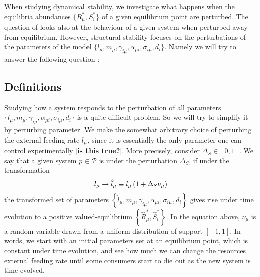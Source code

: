 \documentclass[12pt, titlepage]{report}
\begin{document}
When studying dynamical stability, we investigate what happens when the equilibria abundances $\{R^*_\mu, S^*_i\}$ of a given equilibrium point are perturbed. The question of  looks also at the behaviour of a given system when perturbed away from equilibrium. However, structural stability focuses on the perturbations of the parameters of the model \ie  $\{l_\mu, m_\mu, \gamma_{i\mu}, \alpha_{\mu i}, \sigma_{i\mu},d_i\}$. Namely we will try to answer the following question :

\begin{centering}
\end{centering}

\subsection{Definitions}
Studying how a system responds to the perturbation of all parameters $\{l_\mu, m_\mu, \gamma_{i\mu}, \alpha_{\mu i}, \sigma_{i\mu},d_i\}$ is a quite difficult problem. So we will try to simplify it by perturbing  parameter. We make the somewhat arbitrary choice of perturbing the external feeding rate $l_\mu$, since it is essentially the only parameter one can control experimentally [\textbf{is this true?}]. More precisely, consider $\Delta_S \in [0,1]$. We say that a given system $p \in \mathcal{P}$ is  under the perturbation $\Delta_S$, if under the transformation
\begin{equation}
l_\mu \rightarrow \hat{l}_\mu \equiv l_\mu\left( 1+\Delta_S \nu_\mu \right) \label{eq : ss methods l perturbation}
\end{equation}
the transformed set of parameters $\left\{ \hat{l}_\mu, m_\mu, \gamma_{i\mu}, \alpha_{\mu i}, \sigma_{i\mu},d_i \right\}$ gives rise under time evolution to a positive valued-equilibrium $\left\{\hat{R}^*_\mu, \hat{S}^*_i\right\}$. In the equation above, $\nu_\mu$ is a random variable drawn from a uniform distribution of support $[-1, 1]$. In words, we start with an initial parameters set at an equilibrium point, which is constant under time evolution, and see how much we can change the resources external feeding rate until some consumers start to die out as the new system is time-evolved.
\end{document}
